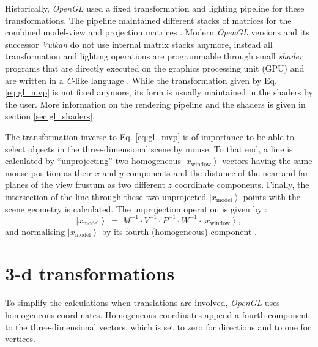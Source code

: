 Historically, \textit{OpenGL} used a fixed transformation and lighting pipeline \cite{wiki_gl_history} for
these transformations. The pipeline maintained different stacks of matrices for the combined model-view and
projection matrices \cite{web_gl_matrixmode}.
Modern \textit{OpenGL} \cite{web_OpenGL} versions and its successor \textit{Vulkan} \cite{web_Vulkan} do not 
use internal matrix stacks anymore, instead all transformation and lighting operations are programmable through 
small \textit{shader} programs that are directly executed on the graphics processing unit (GPU) \cite{wiki_gl_history}
and are written in a \textit{C}-like language \cite{wiki_glsl}.
While the transformation given by Eq. \ref{eq:gl_mvp} is not fixed anymore, its form is usually maintained
in the shaders by the user. More information on the rendering pipeline and the shaders is given in 
section \ref{sec:gl_shaders}.

The transformation inverse to Eq. \ref{eq:gl_mvp} is of importance to be able to select objects in the 
three-dimensional scene by mouse. 
To that end, a line is calculated by ``unprojecting'' two homogeneous $\left|x_{\mathrm{window}}\right>$ vectors
having the same mouse position as their $x$ and $y$ components and the distance of the 
near and far planes of the view frustum as two different $z$ coordinate components.
Finally, the intersection of the line through these two unprojected $\left|x_{\mathrm{model}}\right>$ points 
with the scene geometry is calculated. 
The unprojection operation is given by \cite{web_gl_unproject}:
\begin{equation}
	\left|x_{\mathrm{model}}\right> \ =\ M^{-1} \cdot V^{-1} \cdot P^{-1} \cdot  W^{-1} \cdot  \left| x_{\mathrm{window}} \right>,
\end{equation}
and normalising $\left|x_{\mathrm{model}}\right>$ by its fourth (homogeneous) component \cite{web_gl_unproject}.



\section{3-d transformations}
\label{sec:gl_trafos}
To simplify the calculations when translations are involved, \textit{OpenGL} uses homogeneous coordinates.
Homogeneous coordinates append a fourth component to the three-dimensional vectors, which is set to zero for
directions and to one for vertices.



